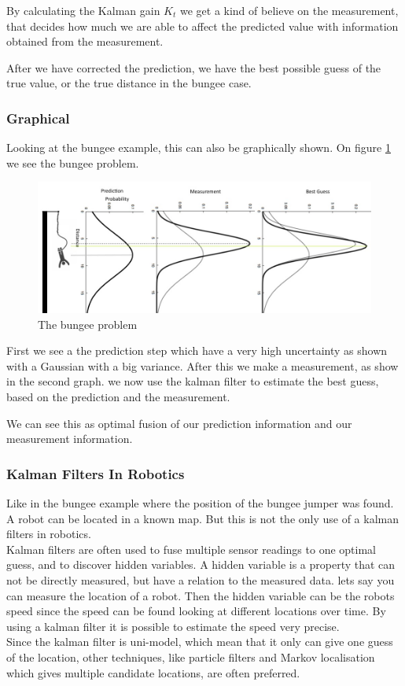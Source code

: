 By calculating the Kalman gain $K_t$ we get a kind of believe on the measurement, that decides how much we are able to affect the predicted value with information obtained from the measurement. 

After we have corrected the prediction, we have the best possible guess of the true value, or the true distance in the bungee case. 
\subsubsection{Graphical}
Looking at the bungee example, this can also be graphically shown. On figure \ref{bungeeFig} we see the bungee problem. 
\begin{figure}[H]
\centering
\includegraphics[width=1\textwidth]{billeder/Bungee.jpg}
\caption{The bungee problem}
\label{bungeeFig}
\end{figure}
First we see a the prediction step which have a very high uncertainty as shown with a Gaussian with a big variance. After this we make a measurement, as show in the second graph. we now use the kalman filter to estimate the best guess, based on the prediction and the measurement. 

We can see this as optimal fusion of our prediction information and our measurement information. 
\subsubsection{Kalman Filters In Robotics}
Like in the bungee example where the position of the bungee jumper was found. A robot can be located in a known map. 
But this is not the only use of a kalman filters in robotics.\\
Kalman filters are often used to fuse multiple sensor readings to one optimal guess, and to discover hidden variables. A hidden variable is a property that can not be directly measured, but have a relation to the measured data. lets say you can measure the location of a robot. Then the hidden variable can be the robots speed since the speed can be found looking at different locations over time. By using a kalman filter it is possible to estimate the speed very precise. \\
Since the kalman filter is uni-model, which mean that it only can give one guess of the location, other techniques, like particle filters and Markov localisation which gives multiple candidate locations, are often preferred. 
